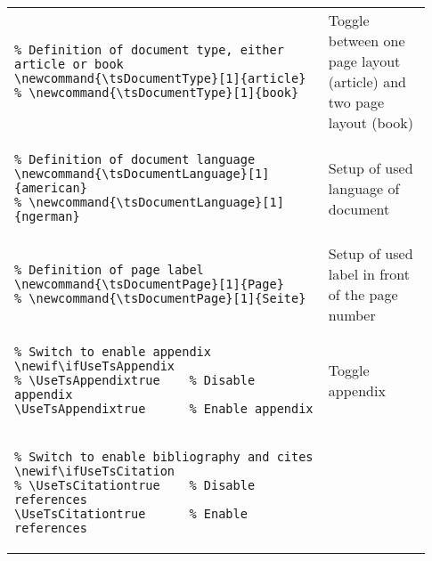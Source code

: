 \begin{footnotesize}
    \renewcommand*{\arraystretch}{1.5}
    \begin{longtable}{ | P{0.7\linewidth} | p{0.23\linewidth} | }
        \hline
         &                                              \\
        \hline
        \begin{BVerbatim}
\newcommand{\tsDocumentType}[1]{article}
        \end{BVerbatim}
         & Toggle between one page layout (article) and two page layout (book)  \\
        \hline
        \begin{BVerbatim}
\newcommand{\tsDocumentLanguage}[1]{american}
        \end{BVerbatim}
         & Setup of used language of document                                   \\
        \hline
        \begin{BVerbatim}
\newcommand{\tsDocumentPage}[1]{Page}
        \end{BVerbatim}
         & Setup of used label in front of the page number                      \\
        \hline
        \begin{BVerbatim}
\newif\ifUseTsAppendix
\UseTsAppendixtrue      %
        \end{BVerbatim}
         & Toggle appendix                                                      \\
        \hline
        \begin{BVerbatim}
\newif\ifUseTsCitation
\UseTsCitationtrue      %
        \end{BVerbatim}

\end{longtable}
\end{footnotesize}
